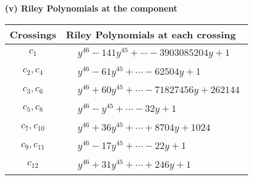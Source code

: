 \documentclass[1p]{elsarticle_modified}
\theoremstyle{definition}
\begin{document}
\flushleft \textbf{(v) Riley Polynomials at the component}\newline \\
\begin{tabular}{m{50pt}|m{274pt}}
Crossings & \hspace{64pt}Riley Polynomials at each crossing \\
\hline $$\begin{aligned}c_{1}\end{aligned}$$&$\begin{aligned}
&y^{46}-141 y^{45}+\cdots-3903085204 y+1
\end{aligned}$\\
\hline $$\begin{aligned}c_{2},c_{4}\end{aligned}$$&$\begin{aligned}
&y^{46}-61 y^{45}+\cdots-62504 y+1
\end{aligned}$\\
\hline $$\begin{aligned}c_{3},c_{6}\end{aligned}$$&$\begin{aligned}
&y^{46}+60 y^{45}+\cdots-71827456 y+262144
\end{aligned}$\\
\hline $$\begin{aligned}c_{5},c_{8}\end{aligned}$$&$\begin{aligned}
&y^{46}- y^{45}+\cdots-32 y+1
\end{aligned}$\\
\hline $$\begin{aligned}c_{7},c_{10}\end{aligned}$$&$\begin{aligned}
&y^{46}+36 y^{45}+\cdots+8704 y+1024
\end{aligned}$\\
\hline $$\begin{aligned}c_{9},c_{11}\end{aligned}$$&$\begin{aligned}
&y^{46}-17 y^{45}+\cdots-22 y+1
\end{aligned}$\\
\hline $$\begin{aligned}c_{12}\end{aligned}$$&$\begin{aligned}
&y^{46}+31 y^{45}+\cdots+246 y+1
\end{aligned}$\\
\hline
\end{tabular}\\~\\
\end{document}

